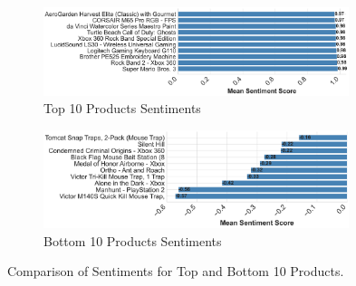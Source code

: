 \begin{figure}[h]
  \centering
  \begin{subfigure}{\textwidth}
    \centering
    \includegraphics[width=0.98\textwidth]{Figures/Top_10_Products_Sentiments.pdf} %
    \caption{Top 10 Products Sentiments}
    \label{fig:top 10 products sentiments}
  \end{subfigure}
  \hfill
  \begin{subfigure}{\textwidth}
    \centering
    \includegraphics[width=0.98\textwidth]{Figures/Bottom_10_Products_Sentiments.pdf} %
    \caption{Bottom 10 Products Sentiments}
    \label{fig:bottom 10 products sentiments}
  \end{subfigure}
  \caption{Comparison of Sentiments for Top and Bottom 10 Products.}
  \label{fig:comparison_sentiments}
\end{figure}


